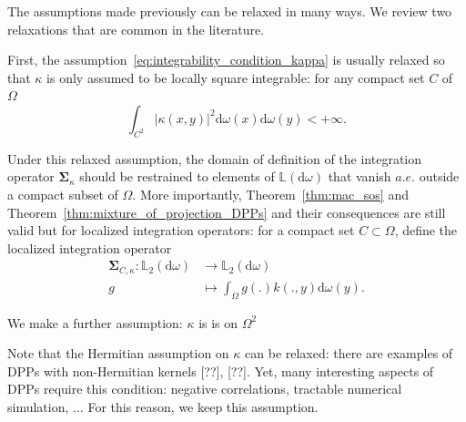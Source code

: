 \documentclass[twoside,11pt]{book}
\newtheorem{example}{Example}
\numberwithin{theorem}{chapter}
\numberwithin{definition}{chapter}
\numberwithin{proposition}{chapter}
\numberwithin{corollary}{chapter}
\numberwithin{example}{chapter}
\numberwithin{lemma}{chapter}
\begin{document}

The assumptions made previously can be relaxed in many ways. We review two relaxations that are common in the literature.

First, the assumption~\eqref{eq:integrability_condition_kappa} is usually relaxed so that $\kappa$ is only assumed to be locally square integrable: for any compact set $C$ of $\Omega$
\begin{equation}
\int_{C^{2}} |\kappa(x,y)|^{2} \mathrm{d}\omega(x) \mathrm{d}\omega(y) < +\infty.
\end{equation}

Under this relaxed assumption, the domain of definition of the integration operator $\bm{\Sigma}_{\kappa}$ should be restrained to elements of $\mathbb{L}(\mathrm{d}\omega)$ that vanish $a.e.$ outside a compact subset of $\Omega$. More importantly, Theorem~\ref{thm:mac_sos} and Theorem~\ref{thm:mixture_of_projection_DPPs} and their consequences are still valid but for localized integration operators: for a compact set $C \subset \Omega$, define the localized integration operator
\begin{align}
  \bm{\Sigma}_{C,\kappa} : \mathbb{L}_{2}(\mathrm{d}\omega) & \rightarrow \mathbb{L}_{2}(\mathrm{d}\omega) \nonumber \\
  g & \mapsto \int_{\Omega}g(.) k(.,y) \mathrm{d}\omega(y). \nonumber
\end{align}


 We make a further assumption: $\kappa$ is is  on $\Omega^{2}$


Note that the Hermitian assumption on $\kappa$ can be relaxed: there are examples of DPPs with non-Hermitian kernels [??], [??]. Yet, many interesting aspects of DPPs require this condition: negative correlations, tractable numerical simulation, $\dots$ For this reason, we keep this assumption.
\end{document}
